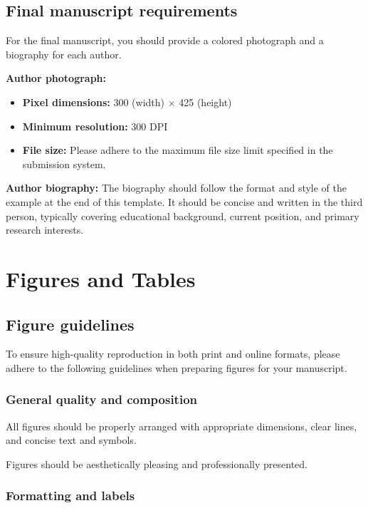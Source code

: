 \documentclass{jcd}
\theoremstyle{plain}
\theoremstyle{definition}
\begin{document}
\subsection{Final manuscript requirements}

For the final manuscript, you should provide a colored photograph and a biography for each author.

\textbf{Author photograph:}
\begin{itemize}
  \item \textbf{Pixel dimensions:} 300 (width) $\times$ 425 (height)
  \item \textbf{Minimum resolution:} 300 DPI
  \item \textbf{File size:} Please adhere to the maximum file size limit specified in the submission system.
\end{itemize}

\textbf{Author biography:} The biography should follow the format and style of the example at the end of this template. It should be concise and written in the third person, typically covering educational background, current position, and primary research interests.


\section{Figures and Tables}

\subsection{Figure guidelines}

To ensure high-quality reproduction in both print and online formats, please adhere to the following guidelines when preparing figures for your manuscript.

\subsubsection{General quality and composition}

All figures should be properly arranged with appropriate dimensions, clear lines, and concise text and symbols.

Figures should be aesthetically pleasing and professionally presented.

\subsubsection{Formatting and labels}
\end{document}
